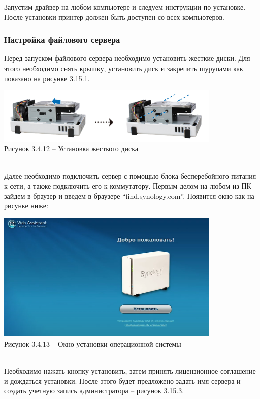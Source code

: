 Запустим драйвер на любом компьютере и следуем инструкции по установке.
После установки принтер должен быть доступен со всех компьютеров.

    \subsubsection{Настройка файлового сервера}
    Перед запуском файлового сервера необходимо установить жесткие диски.
    Для этого необходимо снять крышку, установить диск и закрепить шурупами как показано на рисунке 3.15.1.
    \\
    \begin{center}
        \includegraphics[width=0.8\textwidth]{images/disk}\\
        Рисунок 3.4.12 – Установка жесткого диска
    \end{center}
    \\
    Далее необходимо подключить сервер с помощью блока бесперебойного питания к сети, а также подключить его к коммутатору.
    Первым делом на любом из ПК зайдем в браузер и введем в браузере “find.synology.com”.
    Появится окно как на рисунке ниже:
    \\
    \begin{center}
        \includegraphics[width=0.8\textwidth]{images/OSDisk}\\
        Рисунок 3.4.13 – Окно установки операционной системы
    \end{center}
    \\
    Необходимо нажать кнопку установить, затем принять лицензионное соглашение и дождаться установки.
    После этого будет предложено задать имя сервера и создать учетную запись администратора – рисунок 3.15.3.
